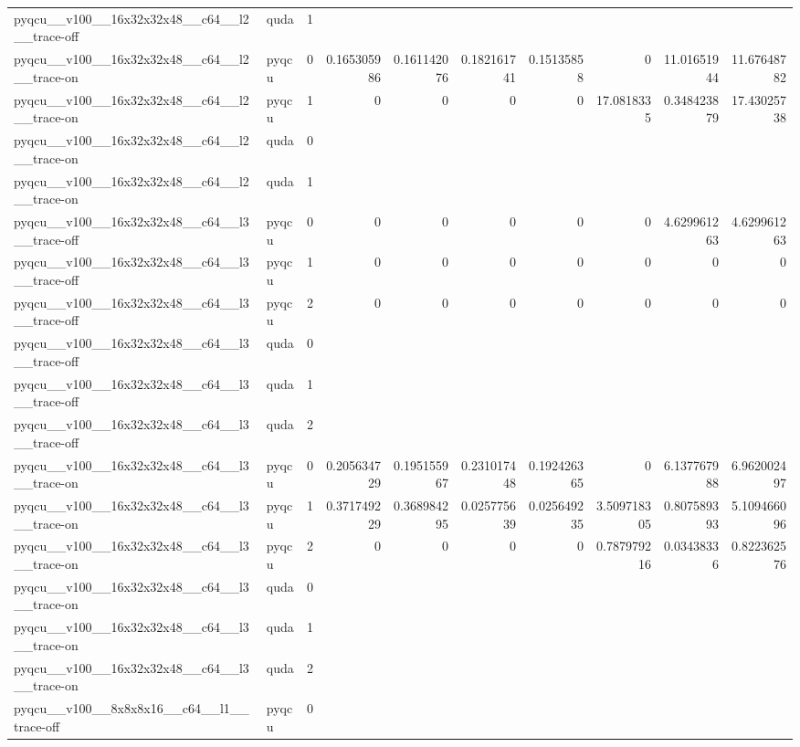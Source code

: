\begin{table}[htbp]
\begin{tabular}{@{}llrrrrrrrr@{}}
pyqcu\_\_v100\_\_16x32x32x48\_\_c64\_\_l2\_\_trace-off & quda & 1 &  &  &  &  &  &  &  \\
pyqcu\_\_v100\_\_16x32x32x48\_\_c64\_\_l2\_\_trace-on & pyqcu & 0 & 0.165305986 & 0.161142076 & 0.182161741 & 0.15135858 & 0 & 11.01651944 & 11.67648782 \\
pyqcu\_\_v100\_\_16x32x32x48\_\_c64\_\_l2\_\_trace-on & pyqcu & 1 & 0 & 0 & 0 & 0 & 17.0818335 & 0.348423879 & 17.43025738 \\
pyqcu\_\_v100\_\_16x32x32x48\_\_c64\_\_l2\_\_trace-on & quda & 0 &  &  &  &  &  &  &  \\
pyqcu\_\_v100\_\_16x32x32x48\_\_c64\_\_l2\_\_trace-on & quda & 1 &  &  &  &  &  &  &  \\
pyqcu\_\_v100\_\_16x32x32x48\_\_c64\_\_l3\_\_trace-off & pyqcu & 0 & 0 & 0 & 0 & 0 & 0 & 4.629961263 & 4.629961263 \\
pyqcu\_\_v100\_\_16x32x32x48\_\_c64\_\_l3\_\_trace-off & pyqcu & 1 & 0 & 0 & 0 & 0 & 0 & 0 & 0 \\
pyqcu\_\_v100\_\_16x32x32x48\_\_c64\_\_l3\_\_trace-off & pyqcu & 2 & 0 & 0 & 0 & 0 & 0 & 0 & 0 \\
pyqcu\_\_v100\_\_16x32x32x48\_\_c64\_\_l3\_\_trace-off & quda & 0 &  &  &  &  &  &  &  \\
pyqcu\_\_v100\_\_16x32x32x48\_\_c64\_\_l3\_\_trace-off & quda & 1 &  &  &  &  &  &  &  \\
pyqcu\_\_v100\_\_16x32x32x48\_\_c64\_\_l3\_\_trace-off & quda & 2 &  &  &  &  &  &  &  \\
pyqcu\_\_v100\_\_16x32x32x48\_\_c64\_\_l3\_\_trace-on & pyqcu & 0 & 0.205634729 & 0.195155967 & 0.231017448 & 0.192426365 & 0 & 6.137767988 & 6.962002497 \\
pyqcu\_\_v100\_\_16x32x32x48\_\_c64\_\_l3\_\_trace-on & pyqcu & 1 & 0.371749229 & 0.368984295 & 0.025775639 & 0.025649235 & 3.509718305 & 0.807589393 & 5.109466096 \\
pyqcu\_\_v100\_\_16x32x32x48\_\_c64\_\_l3\_\_trace-on & pyqcu & 2 & 0 & 0 & 0 & 0 & 0.787979216 & 0.03438336 & 0.822362576 \\
pyqcu\_\_v100\_\_16x32x32x48\_\_c64\_\_l3\_\_trace-on & quda & 0 &  &  &  &  &  &  &  \\
pyqcu\_\_v100\_\_16x32x32x48\_\_c64\_\_l3\_\_trace-on & quda & 1 &  &  &  &  &  &  &  \\
pyqcu\_\_v100\_\_16x32x32x48\_\_c64\_\_l3\_\_trace-on & quda & 2 &  &  &  &  &  &  &  \\
pyqcu\_\_v100\_\_8x8x8x16\_\_c64\_\_l1\_\_trace-off & pyqcu & 0 &  &  &  &  &  &  &  \\

\end{tabular}
\end{table}
